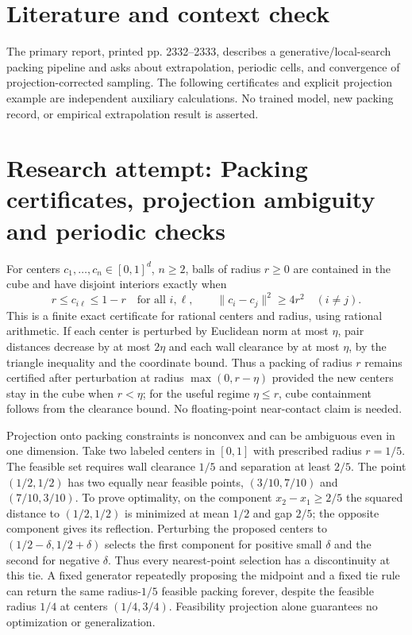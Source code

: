 \documentclass[11pt]{article}
\begin{document}
\section{Literature and context check}
The primary report, printed pp. 2332--2333, describes a generative/local-search packing pipeline and asks about extrapolation, periodic cells, and convergence of projection-corrected sampling. The following certificates and explicit projection example are independent auxiliary calculations. No trained model, new packing record, or empirical extrapolation result is asserted.
\section{Research attempt: Packing certificates, projection ambiguity and periodic checks}

For centers $c_1,\ldots,c_n\in[0,1]^d$, $n\geq2$, balls of radius $r\geq0$ are contained in the cube and have disjoint interiors exactly when
\[
r\leq c_{i\ell}\leq1-r\quad\text{for all }i,\ell,
\qquad \|c_i-c_j\|^2\geq4r^2\quad(i\ne j).
\]
This is a finite exact certificate for rational centers and radius, using rational arithmetic. If each center is perturbed by Euclidean norm at most $\eta$, pair distances decrease by at most $2\eta$ and each wall clearance by at most $\eta$, by the triangle inequality and the coordinate bound. Thus a packing of radius $r$ remains certified after perturbation at radius $\max(0,r-\eta)$ provided the new centers stay in the cube when $r<\eta$; for the useful regime $\eta\leq r$, cube containment follows from the clearance bound. No floating-point near-contact claim is needed.

Projection onto packing constraints is nonconvex and can be ambiguous even in one dimension. Take two labeled centers in $[0,1]$ with prescribed radius $r=1/5$. The feasible set requires wall clearance $1/5$ and separation at least $2/5$. The point $(1/2,1/2)$ has two equally near feasible points, $(3/10,7/10)$ and $(7/10,3/10)$. To prove optimality, on the component $x_2-x_1\geq2/5$ the squared distance to $(1/2,1/2)$ is minimized at mean $1/2$ and gap $2/5$; the opposite component gives its reflection. Perturbing the proposed centers to $(1/2-\delta,1/2+\delta)$ selects the first component for positive small $\delta$ and the second for negative $\delta$. Thus every nearest-point selection has a discontinuity at this tie. A fixed generator repeatedly proposing the midpoint and a fixed tie rule can return the same radius-$1/5$ feasible packing forever, despite the feasible radius $1/4$ at centers $(1/4,3/4)$. Feasibility projection alone guarantees no optimization or generalization.
\end{document}
